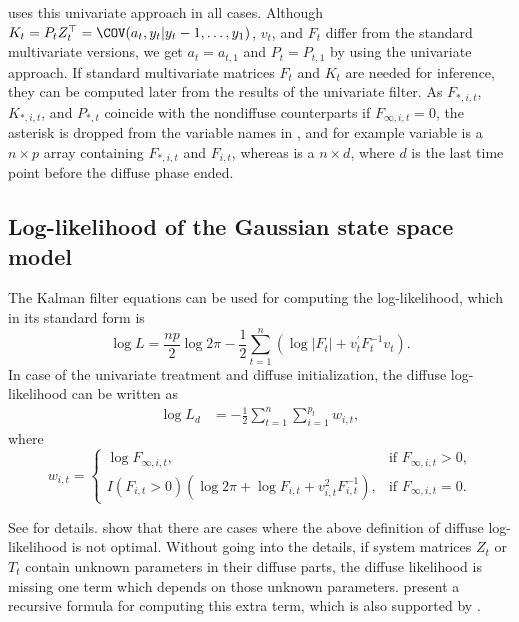 \documentclass[nojss,article]{jss}\usepackage[]{graphicx}\usepackage[]{color}
\begin{document}
 uses this univariate approach in all cases. Although $K_t=P_t Z_t^\top=\COV(a_t,y_t|y_t-1,\ldots,y_1)$, $v_t$, and $F_t$ differ from the standard multivariate versions, we get $a_t=a_{t,1}$ and $P_t=P_{t,1}$ by using the univariate approach. If standard multivariate matrices $F_t$ and $K_t$ are needed for inference, they can be computed later from the results of the univariate filter. As $F_{\ast,i,t}$, $K_{\ast,i,t}$, and $P_{\ast,t}$ coincide with the
nondiffuse counterparts if $F_{\infty,i,t}=0$, the asterisk is dropped from the variable names in , and for example variable  is a $n \times p$ array containing $F_{\ast,i,t}$ and $F_{i,t}$, whereas  is a $n \times d$, where $d$ is the last time point before the diffuse phase ended.


\subsection{Log-likelihood of the Gaussian state space model}

The Kalman filter equations can be used for computing the log-likelihood, which
in its standard form is 
\begin{equation*}\label{logL}
\log L  = \frac{np}{2}\log2\pi - \frac{1}{2}\sum^n_{t=1}(\log|F_t| +
v^\prime_tF^{-1}_tv_t).
\end{equation*}
In case of the univariate treatment and diffuse initialization, the diffuse
log-likelihood can be written as
\begin{equation*}\label{logLd}
\begin{aligned}
\log L_d  &= -\frac{1}{2}\sum^{n}_{t=1}\sum^{p_t}_{i=1}w_{i,t},
\end{aligned}
\end{equation*}
where
\begin{displaymath}
w_{i,t} = \left\{ \begin{array}{ll}
\log F_{\infty,i,t}, &\mbox{if $F_{\infty,i,t}>0$,} \\
I(F_{i,t}>0)(\log2\pi + \log F_{i,t} + v^2_{i,t}F_{i,t}^{-1}), &\mbox{if $F_{\infty,i,t}=0$}.
\end{array} \right.
\end{displaymath}

See \citet[Chapter 7]{DK2012} for details. \citet{Francke2010} show that there are cases where the above definition of diffuse log-likelihood is not optimal. Without going into the details, if system matrices $Z_t$ or $T_t$ contain unknown parameters in their diffuse parts, the diffuse likelihood is missing one term which depends on those unknown parameters. \citet[p.411--412]{Francke2010} present a recursive formula for computing this extra term, which is also supported by .
\end{document}

